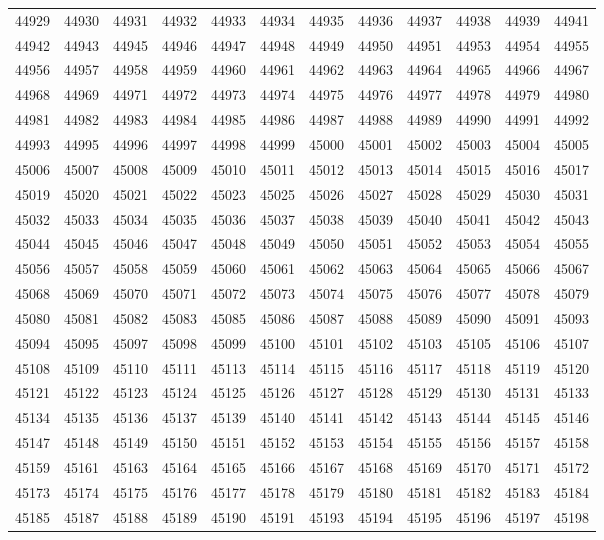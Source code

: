 \begin{center}
\begin{longtable}{llllllllllll}
44929 &44930 &44931 &44932 &44933 &44934 &44935 &44936 &44937 &44938 &44939 &44941 \\
44942 &44943 &44945 &44946 &44947 &44948 &44949 &44950 &44951 &44953 &44954 &44955 \\
44956 &44957 &44958 &44959 &44960 &44961 &44962 &44963 &44964 &44965 &44966 &44967 \\
44968 &44969 &44971 &44972 &44973 &44974 &44975 &44976 &44977 &44978 &44979 &44980 \\
44981 &44982 &44983 &44984 &44985 &44986 &44987 &44988 &44989 &44990 &44991 &44992 \\
44993 &44995 &44996 &44997 &44998 &44999 &45000 &45001 &45002 &45003 &45004 &45005 \\
45006 &45007 &45008 &45009 &45010 &45011 &45012 &45013 &45014 &45015 &45016 &45017 \\
45019 &45020 &45021 &45022 &45023 &45025 &45026 &45027 &45028 &45029 &45030 &45031 \\
45032 &45033 &45034 &45035 &45036 &45037 &45038 &45039 &45040 &45041 &45042 &45043 \\
45044 &45045 &45046 &45047 &45048 &45049 &45050 &45051 &45052 &45053 &45054 &45055 \\
45056 &45057 &45058 &45059 &45060 &45061 &45062 &45063 &45064 &45065 &45066 &45067 \\
45068 &45069 &45070 &45071 &45072 &45073 &45074 &45075 &45076 &45077 &45078 &45079 \\
45080 &45081 &45082 &45083 &45085 &45086 &45087 &45088 &45089 &45090 &45091 &45093 \\
45094 &45095 &45097 &45098 &45099 &45100 &45101 &45102 &45103 &45105 &45106 &45107 \\
45108 &45109 &45110 &45111 &45113 &45114 &45115 &45116 &45117 &45118 &45119 &45120 \\
45121 &45122 &45123 &45124 &45125 &45126 &45127 &45128 &45129 &45130 &45131 &45133 \\
45134 &45135 &45136 &45137 &45139 &45140 &45141 &45142 &45143 &45144 &45145 &45146 \\
45147 &45148 &45149 &45150 &45151 &45152 &45153 &45154 &45155 &45156 &45157 &45158 \\
45159 &45161 &45163 &45164 &45165 &45166 &45167 &45168 &45169 &45170 &45171 &45172 \\
45173 &45174 &45175 &45176 &45177 &45178 &45179 &45180 &45181 &45182 &45183 &45184 \\
45185 &45187 &45188 &45189 &45190 &45191 &45193 &45194 &45195 &45196 &45197 &45198 \\

\end{longtable}
\end{center}
